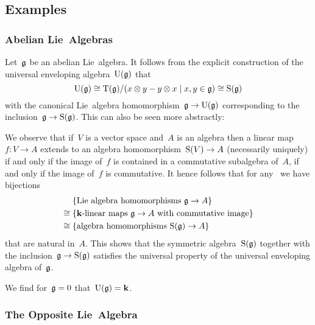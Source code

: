 \subsection{Examples}




\subsubsection{Abelian Lie~Algebras}


\begin{examples}
  Let~$\mathfrak{g}$ be an abelian Lie~algebra.
  It follows from the explicit construction of the universal enveloping algebra~$\operatorname{U}(\mathfrak{g})$ that
  \[
    \Univ(\glie)
    \cong
    \Tensor(\glie)/(x \tensor y - y \tensor x \suchthat x, y \in \glie)
    \cong
    \Symm(\glie)
  \]
  with the canonical Lie~algebra homomorphism~$\mathfrak{g} \to \operatorname{U}(\mathfrak{g})$ corresponding to the inclusion~$\mathfrak{g} \to \operatorname{S}(\mathfrak{g})$.
  This can also be seen more abstractly:
  
  We observe that if~$V$ is a vector space and~$A$ is an algebra then a linear map~$f \colon V \to A$ extends to an algebra homomorphism~$\operatorname{S}(V) \to A$ (necessarily uniquely) if and only if the image of~$f$ is contained in a commutative subalgebra of~$A$, if and only if the image of~$f$ is commutative.
  It hence follows that for any~{\algebra{$\kf$}} we have bijections
  \begin{align*}
    {}&
    \{ \text{Lie~algebra homomorphisms~$\glie \to A$} \}
    \\
    \cong{}&
    \{ \text{{\linear{$\kf$}} maps~$\glie \to A$ with commutative image} \}
    \\
    \cong{}&
    \{ \text{algebra homomorphisms~$\Symm(\glie) \to A$} \}
  \end{align*}
  that are natural in~$A$.
  This shows that the symmetric algebra~$\operatorname{S}(\mathfrak{g})$ together with the inclusion~$\mathfrak{g} \to \operatorname{S}(\mathfrak{g})$ satisfies the universal property of the universal enveloping algebra of~$\mathfrak{g}$.
\end{examples}


\begin{example}
  We find for~$\mathfrak{g} = 0$ that~$\operatorname{U}(\mathfrak{g}) = \mathbf{k}$.
\end{example}





\subsubsection{The Opposite Lie~Algebra}


